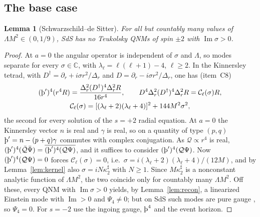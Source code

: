 \documentclass[11pt]{amsart}
\newtheorem{lemma}[theorem]{Lemma}
\theoremstyle{definition}
\theoremstyle{remark}
\numberwithin{equation}{section}
\newcommand{\Th}{\text{\th}}
\newcommand{\C}{\mathbb{C}}
\renewcommand{\Im}{\operatorname{Im}}
\begin{document}
\subsection{The base case}
\begin{lemma}[Schwarzschild--de Sitter]\label{lem:sds}
For all but countably many values of $\Lambda M^2\in(0,1/9)$, SdS has no Teukolsky QNMs of spin $\pm2$ with
$\Im\sigma>0$.
\end{lemma}

\begin{proof}
At $a=0$ the angular operator is independent of $\sigma$ and $\Lambda$, so modes separate for every $\sigma\in\C$, with
$\lambda_\ell=\ell(\ell+1)-4$, $\ell\ge2$. In the Kinnersley tetrad, with $D^\dagger=\partial_r+i\sigma r^2/\Delta_r$ and
$D=\partial_r-i\sigma r^2/\Delta_r$, one has (item~C8)
\begin{equation}\label{eq:sdsTS}
\begin{gathered}
(\Th')^4(r^4R)=\frac{\Delta_r^2(D^\dagger)^4\Delta_r^2R}{16r^4},\qquad D^4\Delta_r^2(D^\dagger)^4\Delta_r^2R=\mathcal C_\ell(\sigma)R,\\
\mathcal C_\ell(\sigma)=[(\lambda_\ell+2)(\lambda_\ell+4)]^2+144M^2\sigma^2,
\end{gathered}
\end{equation}
the second for every solution of the $s=+2$ radial equation. At $a=0$ the Kinnersley vector $n$ is real and $\gamma$ is real, so on a quantity of type $(p,q)$
$\Th'=n-(p+q)\gamma$ commutes with complex conjugation. As $\mathcal Q\propto r^4$ is real,
$(\Th')^4(\bar{\mathcal Q}\bar\Psi)=\overline{(\Th')^4(\mathcal Q\Psi)}$, and it suffices to consider $(\Th')^4(\mathcal Q\Psi)$. Now $(\Th')^4(\mathcal Q\Psi)=0$ forces
$\mathcal C_\ell(\sigma)=0$, i.e.\ $\sigma=i(\lambda_\ell+2)(\lambda_\ell+4)/(12M)$, and by Lemma~\ref{lem:kernel} also
$\sigma=iN\kappa_2^\sharp$ with $N\ge1$. Since $M\kappa_2^\sharp$ is a nonconstant analytic function of $\Lambda M^2$, the two
coincide only for countably many $\Lambda M^2$. Off these, every QNM with $\Im\sigma>0$ yields, by Lemma~\ref{lem:recon},
a linearized Einstein mode with $\Im>0$ and $\Psi_4\ne0$; but on SdS such modes are pure gauge \cite[\S7]{HV18}, so
$\Psi_4=0$. For $s=-2$ use the ingoing gauge, $\Th^4$ and the event horizon.
\end{proof}
\end{document}
